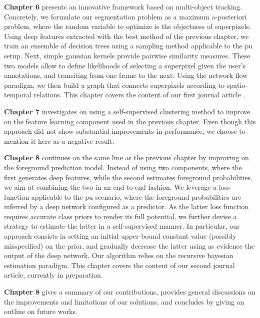 \textbf{Chapter 6} presents an innovative framework based on multi-object tracking.
Concretely, we formulate our segmentation problem as a maximum a-posteriori problem, where the random variable to optimize is the objectness of superpixels.
Using deep features extracted with the best method of the previous chapter, we train an ensemble of decision trees using a sampling method applicable to the \gls{pu} setup.
Next, simple gaussian kernels provide pairwise similarity measures.
These two models allow to define likelihoods of selecting a superpixel given the user's annotations, and transiting from one frame to the next.
Using the network flow paradigm, we then build a graph that connects superpixels according to spatio-temporal relations.
This chapter covers the content of our first journal article \cite{lejeune18}.

\textbf{Chapter 7} investigates on using a self-supervised clustering method to improve on the feature learning component used in the previous chapter.
Even though this approach did not show substantial improvements in performance, we choose to mention it here as a negative result.

\textbf{Chapter 8} continues on the same line as the previous chapter by improving on the foreground prediction model.
Instead of using two components, where the first generates deep features, while the second estimates foreground probabilities, we aim at combining the two in an end-to-end fashion.
We leverage a loss function applicable to the \gls{pu} scenario, where the foreground probabilities are inferred by a deep network configured as a predictor.
As the latter loss function requires accurate class priors to render its full potential, we further devise a strategy to estimate the latter in a self-supervised manner.
In particular, our approach consists in setting an initial upper-bound constant value (possibly misspecified) on the prior, and gradually decrease the latter using as evidence the output of the deep network.
Our algorithm relies on the recursive bayesian estimation paradigm.
This chapter covers the content of our second journal article, currently in preparation.

\textbf{Chapter 8} gives a summary of our contributions, provides general discussions on the improvements and limitations of our solutions, and concludes by giving an outline on future works.

